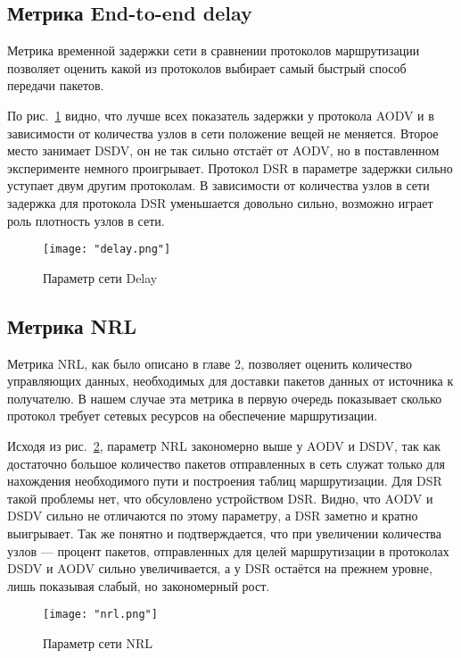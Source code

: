 \subsection{Метрика End-to-end delay}

Метрика временной задержки сети в сравнении протоколов маршрутизации позволяет оценить какой из протоколов выбирает самый быстрый способ передачи пакетов.

По рис.~\ref{fig:delay_plot} видно, что лучше всех показатель задержки у протокола AODV и в зависимости от количества узлов в сети положение вещей не меняется. Второе место занимает DSDV, он не так сильно отстаёт от AODV, но в поставленном эксперименте немного проигрывает. Протокол DSR в параметре задержки сильно уступает двум другим протоколам. В зависимости от количества узлов в сети задержка для протокола DSR уменьшается довольно сильно, возможно играет роль плотность узлов в сети.
  
\begin{figure}[!h]
    \centering
    \texttt{[image: "delay.png"]}
    \caption{Параметр сети Delay}
    \label{fig:delay_plot}
\end{figure}

\subsection{Метрика NRL}

Метрика NRL, как было описано в главе 2, позволяет оценить количество управляющих данных, необходимых для доставки пакетов данных от источника к получателю. В нашем случае эта метрика в первую очередь показывает сколько протокол требует сетевых ресурсов на обеспечение маршрутизации.

Исходя из рис.~\ref{fig:nrl_plot}, параметр NRL закономерно выше у AODV и DSDV, так как достаточно большое количество пакетов отправленных в сеть служат только для нахождения необходимого пути и построения таблиц маршрутизации. Для DSR такой проблемы нет, что обсуловлено устройством DSR. Видно, что AODV и DSDV сильно не отличаются по этому параметру, а DSR заметно и кратно выигрывает. Так же понятно и подтверждается, что при увеличении количества узлов --- процент пакетов, отправленных для целей маршрутизации в протоколах DSDV и AODV сильно увеличивается, а у DSR остаётся на прежнем уровне, лишь показывая слабый, но закономерный рост.

\begin{figure}[!h]
    \centering
    \texttt{[image: "nrl.png"]}
    \caption{Параметр сети NRL}
    \label{fig:nrl_plot}
\end{figure}

